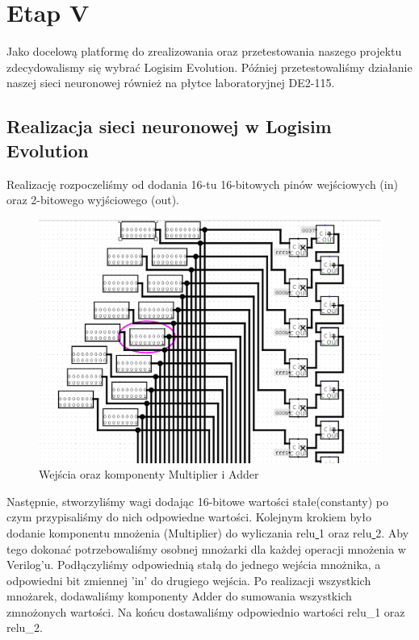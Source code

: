 \documentclass[a4paper, titleauthor]{mwart}
\begin{document}
\newpage
\section{\large Etap V}

Jako docelową platformę do zrealizowania oraz przetestowania naszego projektu zdecydowalismy się wybrać Logisim Evolution. Później przetestowaliśmy działanie naszej sieci neuronowej również na płytce laboratoryjnej DE2-115.

\subsection{Realizacja sieci neuronowej w Logisim Evolution}
Realizację rozpoczeliśmy od dodania 16-tu 16-bitowych pinów wejściowych (in) oraz 2-bitowego wyjściowego (out).

\begin{figure}[h]
\centering
    \includegraphics[width=0.8\linewidth]{Inputs.png}
    \caption{Wejścia oraz komponenty Multiplier i Adder}
\end{figure}

Następnie, stworzyliśmy wagi dodając 16-bitowe wartości stałe(constanty) po czym przypisaliśmy do nich odpowiedne wartości.
\newline
Kolejnym krokiem było dodanie komponentu mnożenia (Multiplier) do wyliczania relu\underline{ }1 oraz relu\underline{ }2. Aby tego dokonać potrzebowaliśmy osobnej mnożarki dla każdej operacji mnożenia w Verilog'u. Podłączyliśmy odpowiednią stałą do jednego wejścia mnożnika, a odpowiedni bit zmiennej 'in' do drugiego wejścia.  
\newline
Po realizacji wszystkich mnożarek, dodawaliśmy komponenty Adder do sumowania wszystkich zmnożonych wartości. Na końcu dostawaliśmy odpowiednio wartości relu\_1 oraz relu\_2.
\newpage
\end{document}
